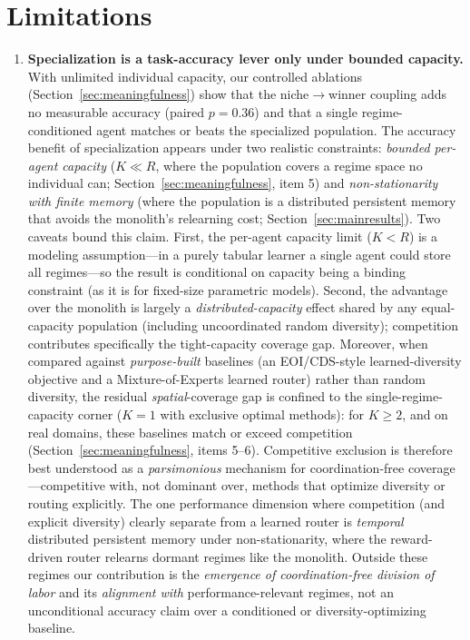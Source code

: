 \documentclass{article}
\begin{document}
\section{Limitations}
\label{sec:limitations}

\begin{enumerate}
    \item \textbf{Specialization is a task-accuracy lever only under bounded
    capacity.} With unlimited individual capacity, our controlled ablations
    (Section~\ref{sec:meaningfulness}) show that the niche$\to$winner coupling
    adds no measurable accuracy (paired $p = 0.36$) and that a single
    regime-conditioned agent matches or beats the specialized population. The
    accuracy benefit of specialization appears under two realistic constraints:
    \emph{bounded per-agent capacity} ($K \ll R$, where the population covers a
    regime space no individual can; Section~\ref{sec:meaningfulness}, item 5) and
    \emph{non-stationarity with finite memory} (where the population is a
    distributed persistent memory that avoids the monolith's relearning cost;
    Section~\ref{sec:mainresults}). Two caveats bound this claim. First, the per-agent capacity limit
    ($K<R$) is a modeling assumption---in a purely tabular learner a single agent
    could store all regimes---so the result is conditional on capacity being a
    binding constraint (as it is for fixed-size parametric models). Second, the
    advantage over the monolith is largely a \emph{distributed-capacity} effect
    shared by any equal-capacity population (including uncoordinated random
    diversity); competition contributes specifically the tight-capacity coverage
    gap. Moreover, when compared against \emph{purpose-built} baselines (an EOI/CDS-style
    learned-diversity objective and a Mixture-of-Experts learned router) rather than
    random diversity, the residual \emph{spatial}-coverage gap is confined to the
    single-regime-capacity corner ($K{=}1$ with exclusive optimal methods): for
    $K\geq2$, and on real domains, these baselines match or exceed competition
    (Section~\ref{sec:meaningfulness}, items 5--6). Competitive exclusion is
    therefore best understood as a \emph{parsimonious} mechanism for
    coordination-free coverage---competitive with, not dominant over, methods that
    optimize diversity or routing explicitly. The one performance dimension where
    competition (and explicit diversity) clearly separate from a learned router is
    \emph{temporal} distributed persistent memory under non-stationarity, where the
    reward-driven router relearns dormant regimes like the monolith. Outside these
    regimes our contribution is the
    \emph{emergence of coordination-free division of labor} and its
    \emph{alignment with} performance-relevant regimes, not an unconditional
    accuracy claim over a conditioned or diversity-optimizing baseline.


\end{enumerate}
\end{document}
